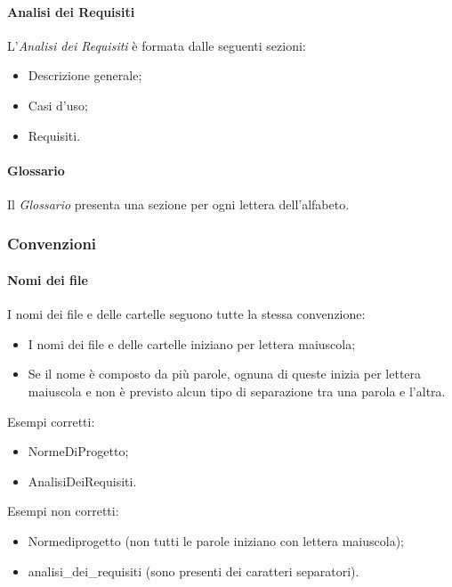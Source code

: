 \paragraph{Analisi dei Requisiti}
L'\textit{Analisi dei Requisiti} è formata dalle seguenti sezioni:
\begin{itemize}
	\item Descrizione generale;
	\item Casi d'uso;
	\item Requisiti.
\end{itemize}

\paragraph{Glossario}
Il \textit{Glossario} presenta una sezione per ogni lettera dell'alfabeto. 

\subsubsection{Convenzioni}

\paragraph{Nomi dei file}
I nomi dei file e delle cartelle seguono tutte la stessa convenzione:

\begin{itemize}

	\item I nomi dei file e delle cartelle iniziano per lettera maiuscola;
	
	\item Se il nome è composto da più parole, ognuna di queste inizia per lettera maiuscola e non è previsto alcun tipo di separazione tra una parola e l'altra.
	
\end{itemize}

Esempi corretti:

\begin{itemize}

	\item NormeDiProgetto;
	
	\item AnalisiDeiRequisiti.
	
\end{itemize}

Esempi non corretti:

\begin{itemize}

	\item Normediprogetto (non tutti le parole iniziano con lettera maiuscola);
	
	\item analisi\_dei\_requisiti (sono presenti dei caratteri separatori).
\end{itemize}


